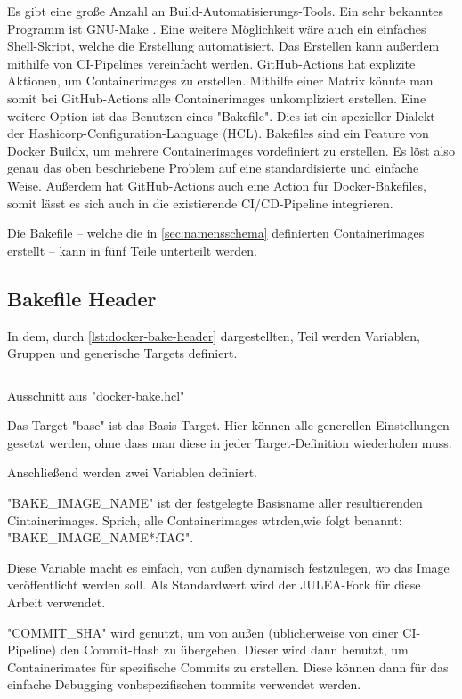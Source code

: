 Es gibt eine große Anzahl an Build-Automatisierungs-Tools. Ein sehr bekanntes Programm ist GNU-Make \cite{GNUMake}. Eine weitere Möglichkeit wäre auch ein einfaches Shell-Skript, welche die Erstellung automatisiert. Das Erstellen kann außerdem mithilfe von CI-Pipelines vereinfacht werden. GitHub-Actions hat explizite Aktionen, um Containerimages zu erstellen. Mithilfe einer Matrix könnte man somit bei GitHub-Actions alle Containerimages unkompliziert erstellen. Eine weitere Option ist das Benutzen eines "Bakefile". Dies ist ein spezieller Dialekt der Hashicorp-Configuration-Language (HCL). Bakefiles sind ein Feature von Docker Buildx, um mehrere Containerimages vordefiniert zu erstellen. Es löst also genau das oben beschriebene Problem auf eine standardisierte und einfache Weise. Außerdem hat GitHub-Actions auch eine Action für Docker-Bakefiles, somit lässt es sich auch in die existierende CI/CD-Pipeline integrieren. 

Die Bakefile – welche die in \cref{sec:namensschema} definierten Containerimages erstellt – kann in fünf Teile unterteilt werden.

\subsection{Bakefile Header}

In dem, durch \cref{lst:docker-bake-header} dargestellten, Teil werden Variablen, Gruppen und generische Targets definiert.

\begin{listing}[H]
    \inputminted[firstline=1,lastline=7]{./lexers/docker-bake-lexer.py}{./code-examples/docker-bake.hcl}
    \caption{Ausschnitt aus "docker-bake.hcl"}
    \label{lst:docker-bake-header}
\end{listing}

Das Target "base" ist das Basis-Target. Hier können alle generellen Einstellungen gesetzt werden, ohne dass man diese in jeder Target-Definition wiederholen muss. 

Anschließend werden zwei Variablen definiert. 

"BAKE\_IMAGE\_NAME" ist der festgelegte Basisname aller resultierenden Cintainerimages. Sprich, alle Containerimages wtrden,wie folgt benannt: "BAKE\_IMAGE\_NAME*:TAG".

Diese Variable macht es einfach, von außen dynamisch festzulegen, wo das Image veröffentlicht werden soll. Als Standardwert wird der JULEA-Fork für diese Arbeit verwendet.

"COMMIT\_SHA" wird genutzt, um von außen (üblicherweise von einer CI-Pipeline) den Commit-Hash zu übergeben. Dieser wird dann benutzt, um Containerimates für spezifische Commits zu erstellen. Diese können dann für das einfache Debugging vonbspezifischen tommits verwendet werden.

